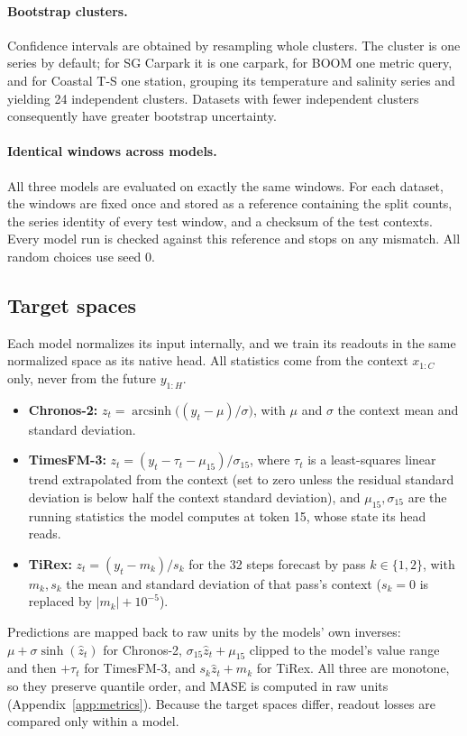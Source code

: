 \documentclass{article} %
\begin{document}
\paragraph{Bootstrap clusters.}
Confidence intervals are obtained by resampling whole clusters. The cluster is one series by default; for SG Carpark it is one carpark, for BOOM one metric query, and for Coastal T-S one station, grouping its temperature and salinity series and yielding 24 independent clusters. Datasets with fewer independent clusters consequently have greater bootstrap uncertainty.

\paragraph{Identical windows across models.}
All three models are evaluated on exactly the same windows. For each dataset, the windows are fixed once and stored as a reference containing the split counts, the series identity of every test window, and a checksum of the test contexts. Every model run is checked against this reference and stops on any mismatch. All random choices use seed 0.

\subsection{Target spaces}
  \label{app:targets}

  Each model normalizes its input internally, and we train its readouts in the same normalized space
  as its native head. All statistics come from the context $x_{1:C}$ only, never from the future $y_{1:H}$.
  \begin{itemize}[leftmargin=*]
    \item \textbf{Chronos-2:} $z_t=\operatorname{arcsinh}\bigl((y_t-\mu)/\sigma\bigr)$, with $\mu$ and $\sigma$ the context mean and standard deviation.
    \item \textbf{TimesFM-3:} $z_t=(y_t-\tau_t-\mu_{15})/\sigma_{15}$, where $\tau_t$ is a least-squares linear trend extrapolated from the context (set to zero unless the residual standard deviation is below
  half the context standard deviation), and $\mu_{15},\sigma_{15}$ are the running statistics the model computes at token 15, whose state its head reads.
    \item \textbf{TiRex:} $z_t=(y_t-m_k)/s_k$ for the 32 steps forecast by pass $k\in\{1,2\}$, with $m_k,s_k$ the mean and standard deviation of that pass's context ($s_k=0$ is replaced by
  $|m_k|+10^{-5}$).
  \end{itemize}
  Predictions are mapped back to raw units by the models' own inverses: $\mu+\sigma\sinh(\hat z_t)$ for Chronos-2, $\sigma_{15}\hat z_t+\mu_{15}$ clipped to the model's value range and then $+\tau_t$ for
  TimesFM-3, and $s_k\hat z_t+m_k$ for TiRex. All three are monotone, so they preserve quantile order, and MASE is computed in raw units (Appendix~\ref{app:metrics}). Because the target spaces differ,
  readout losses are compared only within a model.
\end{document}
